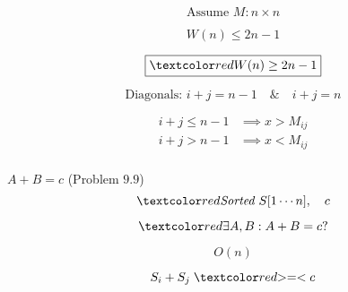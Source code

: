 \begin{frame}{}
  \[
    \text{Assume } M: n \times n 
  \]

  \[
    W(n) \le 2n - 1
  \]

  \pause
  \[
    \boxed{\red{W(n) \ge 2n - 1}}
  \]

  \pause
  \centerline{}

  \pause
  \[
    \text{Diagonals: } i + j = n - 1 \quad\&\quad i + j = n
  \]

  \pause
  \centerline{}

  \pause
  \begin{align*}
    i + j \le n - 1 &\implies x > M_{ij} \\
    i + j > n - 1 &\implies x < M_{ij} \\
  \end{align*}
\end{frame}

\begin{frame}{}
  \begin{exampleblock}{$A + B = c$ (Problem $9.9$)}
    \[
      \red{\text{\it Sorted }} S[1 \cdots n], \quad c
    \]

    \[
      \red{\exists A, B: A + B = c?}
    \]

    \pause
    \[
      O(n)
    \]
  \end{exampleblock}

  \pause
  \vspace{0.50cm}
  \centerline{}

  \[
    S_i + S_j \;\red{>=<}\; c
  \]
\end{frame}
